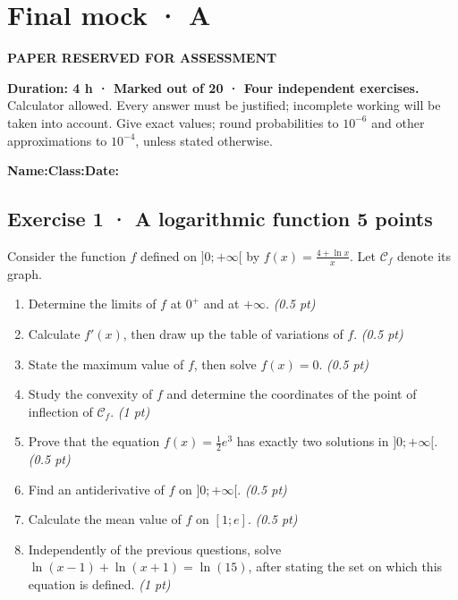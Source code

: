\fi

\ifprof

\clearpage{}\label{sujet:9-3}

\section*{Final mock · A}

{\sffamily\bfseries\color{amber}PAPER RESERVED FOR ASSESSMENT\par}

\textbf{Duration: 4 h · Marked out of 20 · Four independent exercises.}\\Calculator allowed. Every answer must be justified; incomplete working will be taken into account. Give exact values; round probabilities to $10^{-6}$ and other approximations to $10^{-4}$, unless stated otherwise.

\smallskip\textbf{Name:}\enspace\dotfill\quad\textbf{Class:}\enspace\dotfill\quad\textbf{Date:}\enspace\dotfill

\subsection*{Exercise 1 · A logarithmic function \hfill 5 points}Consider the function $f$ defined on $]0;+\infty[$ by $f(x)=\frac{4+\ln x}x$. Let $\mathcal C_f$ denote its graph.

\begin{enumerate}

\item Determine the limits of $f$ at $0^+$ and at $+\infty$. \hfill\textit{(0.5 pt)}

\item Calculate $f' (x)$, then draw up the table of variations of $f$. \hfill\textit{(0.5 pt)}

\item State the maximum value of $f$, then solve $f(x)=0$. \hfill\textit{(0.5 pt)}

\item Study the convexity of $f$ and determine the coordinates of the point of inflection of $\mathcal C_f$. \hfill\textit{(1 pt)}

\item Prove that the equation $f(x)=\frac12 e^{3}$ has exactly two solutions in $]0;+\infty[$. \hfill\textit{(0.5 pt)}

\item Find an antiderivative of $f$ on $]0;+\infty[$. \hfill\textit{(0.5 pt)}

\item Calculate the mean value of $f$ on $[1;e]$. \hfill\textit{(0.5 pt)}

\item Independently of the previous questions, solve $\ln(x-1)+\ln(x+1)=\ln(15)$, after stating the set on which this equation is defined. \hfill\textit{(1 pt)}

\end{enumerate}

